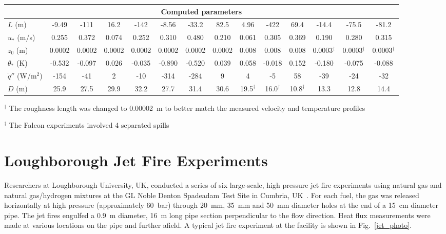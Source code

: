 \begin{table}
\begin{center}
\begin{tabular}{|l|c|c|c|c|c|c|c|c|c|c|c|c|c|}
\multicolumn{14}{|c|}{Computed parameters} \\ \hline
$L$ (m)                        & -9.49  & -111   & 16.2   & -142   & -8.56  & -33.2  & 82.5        & 4.96        & -422        & 69.4              & -14.4           & -75.5          & -81.2   \\ \hline
$u_*$ (m/s)                    & 0.255  & 0.372  & 0.074  & 0.252  & 0.310  & 0.480  & 0.210       & 0.061       & 0.305       & 0.369             & 0.190           & 0.280          & 0.315   \\ \hline
$z_0$ (m)                      & 0.0002 & 0.0002 & 0.0002 & 0.0002 & 0.0002 & 0.0002 & 0.0002      & 0.008       & 0.008       & 0.008             & 0.0003$^\ddag$  & 0.0003$^\ddag$ & 0.0003$^\ddag$  \\ \hline
$\theta_*$ (K)                 & -0.532 & -0.097 & 0.026  & -0.035 & -0.890 & -0.520 & 0.039       & 0.058       & -0.018      & 0.152             & -0.180          & -0.075         & -0.088  \\ \hline
$\dot{q}''$ (W/m$^2$)          & -154   & -41    & 2      & -10    & -314   & -284   & 9           & 4           & -5          & 58                & -39             & -24            & -32     \\ \hline
$D$ (m)                        & 25.9   & 27.5   & 29.9   & 32.2   & 27.7   & 31.4   & 30.6        & 19.5$^\dag$ & 16.0$^\dag$ & 10.8$^\dag$       & 13.3            & 12.8           & 14.4    \\ \hline
\end{tabular}
\end{center}
$^\ddag$ The roughness length was changed to 0.00002~m to better match the measured velocity and temperature profiles

$^\dag$ The Falcon experiments involved 4 separated spills
\label{tab:LNG_Dispersion}
\end{table}



\section{Loughborough Jet Fire Experiments}
\label{Loughborough_Jet_Fires_Description}

Researchers at Loughborough University, UK, conducted a series of six large-scale, high pressure jet fire experiments using natural gas and natural gas/hydrogen mixtures at the GL Noble Denton Spadeadam Test Site in Cumbria, UK~\cite{Lowesmith:PSEP2012}. For each fuel, the gas was released horizontally at high pressure (approximately 60~bar) through 20~mm, 35~mm and 50~mm diameter holes at the end of a 15~cm diameter pipe. The jet fires engulfed a 0.9~m diameter, 16~m long pipe section perpendicular to the flow direction. Heat flux measurements were made at various locations on the pipe and further afield. A typical jet fire experiment at the facility is shown in Fig.~\ref{jet_photo}.

